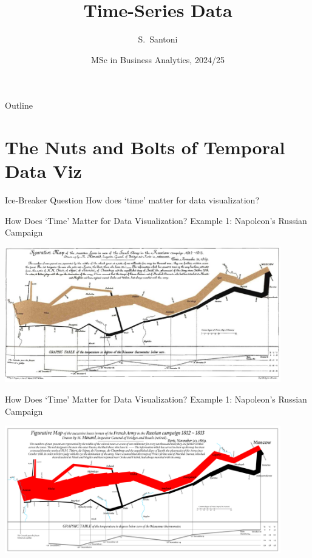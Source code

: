 \documentclass[notes, aspectratio=1610]{beamer}
\title{Time-Series Data}
\author{S.~Santoni\inst{1}\inst{2}}
\institute{
	\inst{1}%
	Bayes Business School
	}
\date{MSc in Business Analytics, 2024/25}
\begin{document}
\begin{frame}
	\titlepage
\end{frame}

\begin{frame}{Outline}
	\tableofcontents
\end{frame}

\section{The Nuts and Bolts of Temporal Data Viz}

\begin{frame}{Ice-Breaker Question}{}
	\centering 
	\Large 
	How does `time' matter for data visualization?
\end{frame}

\begin{frame}{How Does `Time' Matter for Data Visualization?}
	{Example 1: Napoleon's Russian Campaign}
	\centering 
	\Large

	\includegraphics[width=0.9\textwidth]{images/russian_campaign.png}

\end{frame}

\begin{frame}{How Does `Time' Matter for Data Visualization?}
	{Example 1: Napoleon's Russian Campaign}
	\centering 
	\Large

	\includegraphics[width=0.9\textwidth]{images/1920px-Minard_Update.png}

\end{frame}
\end{document}
